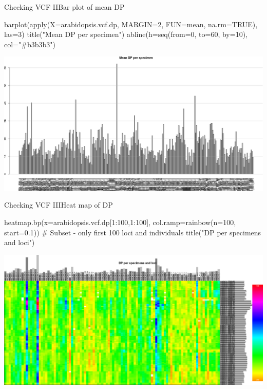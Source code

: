\documentclass[compress, ucs, xelatex, 11pt, xcolor=svgnames,
	hyperref={
		bookmarks=true,
		unicode=true,
		colorlinks=true,
		pdftitle={Molecular data in R},
		plainpages=false,
		pdfauthor={Vojtech Zeisek},
		pdfsubject={Course about phylogeny and evolution in R},
		pdfcreator={XeLaTeX},
		pdfkeywords={R, evolution, phylogeny, molecular data},
		linkcolor=Tomato,
		anchorcolor=SaddleBrown,
		citecolor=Goldenrod,
		filecolor=DarkMagenta,
		menucolor=Sienna,
		urlcolor=DarkTurquoise,
		pdftex},
	url={hyphens, lowtilde} %
	]{beamer}
\begin{document}
\begin{frame}[fragile]{Checking VCF II}{Bar plot of mean DP}
	\begin{spluscode}
    barplot(apply(X=arabidopsis.vcf.dp, MARGIN=2, FUN=mean, na.rm=TRUE),
      las=3)
    title("Mean DP per specimen")
    abline(h=seq(from=0, to=60, by=10), col="#b3b3b3")
	\end{spluscode}
	\begin{center}
		\includegraphics[width=\textwidth-2cm]{vcf_dp_mean.png}
	\end{center}
\end{frame}

\begin{frame}[fragile]{Checking VCF III}{Heat map of DP}
	\begin{spluscode}
    heatmap.bp(x=arabidopsis.vcf.dp[1:100,1:100], col.ramp=rainbow(n=100,
      start=0.1)) # Subset - only first 100 loci and individuals
    title("DP per specimens and loci")
	\end{spluscode}
	\begin{center}
		\includegraphics[width=\textwidth-1.25cm]{vcf_dp_heatmap.png}
	\end{center}
\end{frame}
\end{document}
